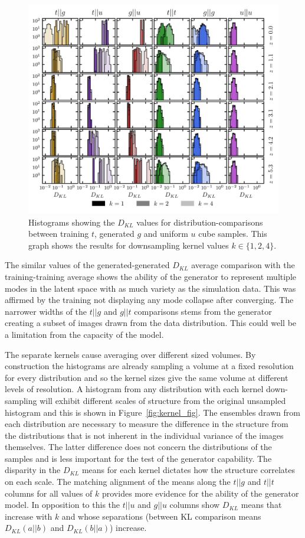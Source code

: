 \documentclass[twocolumn]{article}
\numberwithin{equation}{section}
\begin{document}
\begin{figure}[hbt!]
\includegraphics[width=17cm]{figures/graphs/kl_trials_all_z_train1.png}
\centering
\caption{Histograms showing the $D_{KL}$ values for distribution-comparisons between training $t$, generated $g$ and 
         uniform $u$ cube samples. This graph shows the results for downsampling kernel values $k \in \{1, 2, 4\}$.}
\label{fig:kl_trials_all_z1}
\end{figure}


The similar values of the generated-generated $D_{KL}$ average comparison with the training-training average shows the 
ability of the generator to represent multiple modes in the latent space with as much variety as the simulation data. 
This was affirmed by the training not displaying any mode collapse after converging. The narrower widths of the $t||g$ 
and $g||t$ comparisons stems from the generator creating a subset of images drawn from the data distribution. This could
well be a limitation from the capacity of the model.

The separate kernels cause averaging over different sized volumes. By construction the histograms are already sampling a 
volume at a fixed resolution for every distribution and so the kernel sizes give the same volume at different levels of 
resolution. A histogram from any distribution with each kernel down-sampling will exhibit different scales of structure 
from the original unsampled histogram and this is shown in Figure~\ref{fig:kernel_fig}. The ensembles drawn from each 
distribution are necessary to measure the difference in the structure from the distributions that is not inherent in the 
individual variance of the images themselves. The latter difference does not concern the distributions of the samples and 
is less important for the test of the generator capability. The disparity in the $D_{KL}$ means for each kernel dictates 
how the structure correlates on each scale. The matching alignment of the means along the $t||g$ and $t||t$ columns for 
all values of $k$ provides more evidence for the ability of the generator model. In opposition to this the $t||u$ and $g||u$
columns show $D_{KL}$ means that increase with $k$ and whose separations (between KL comparison means $D_{KL}(a||b)$ and
$D_{KL}(b||a)$) increase.
\end{document}
